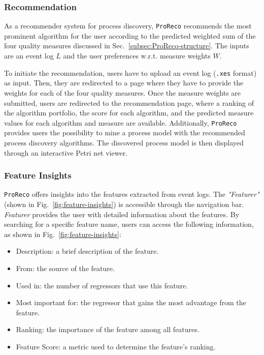 \vspace{-0.5em}
\subsubsection{Recommendation}
As a recommender system for process discovery, \texttt{ProReco} recommends the most prominent algorithm for the user according to the predicted weighted sum of the four quality measures discussed in Sec.~\ref{subsec:ProReco-structure}. 
The inputs are an event log $L$ and the user preferences w.r.t. measure weights $W$.

To initiate the recommendation, users have to upload an event log (\texttt{.xes} format) as input. 
Then, they are redirected to a page where they have to provide the weights for each of the four quality measures. 
Once the measure weights are submitted, users are redirected to the recommendation page, where a ranking of the algorithm portfolio, the score for each algorithm, and the predicted measure values for each algorithm and measure are available. 
Additionally, \texttt{ProReco} provides users the possibility to mine a process model with the recommended process discovery algorithms. 
The discovered process model is then displayed through an interactive Petri net viewer. 

\vspace{-0.5em}
\subsubsection{Feature Insights}
\texttt{ProReco} offers insights into the features extracted from event logs. 
The \textit{"Featurer"} (shown in Fig.~\ref{fig:feature-insights}) is accessible through the navigation bar. 
\textit{Featurer} provides the user with detailed information about the features. 
By searching for a specific feature name, users can access the following information, as shown in Fig.~\ref{fig:feature-insights}:
\begin{itemize}
    \item Description: a brief description of the feature.
    \item From: the source of the feature.
    \item Used in: the number of regressors that use this feature.
    \item Most important for: the regressor that gains the most advantage from the feature.
    \item Ranking: the importance of the feature among all features.
    \item Feature Score: a metric used to determine the feature’s ranking.
\end{itemize}

